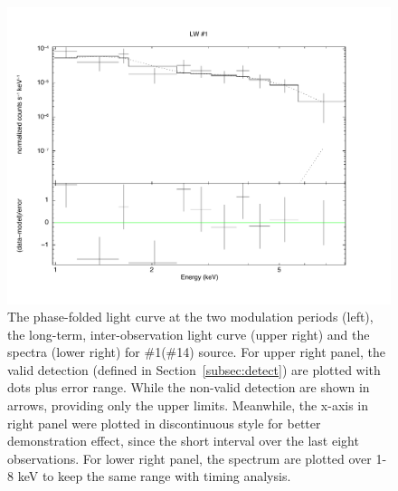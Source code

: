 \documentclass[fleqn,usenatbib]{mnras}
\begin{document}
\begin{figure}
\begin{minipage}[b]{0.44\textwidth}
\includegraphics[width=1.01\textwidth]{./figure/LW/324001_spec.pdf}
\end{minipage}
\caption{The phase-folded light curve at the two modulation periods (left), the long-term, inter-observation light curve (upper right) and the spectra (lower right) for \#1(\#14) source.
For upper right panel, the valid detection (defined in Section~\ref{subsec:detect}) are plotted with dots plus error range. While the non-valid detection are shown in arrows, providing only the upper limits. Meanwhile, the x-axis in right panel were plotted in discontinuous style for better demonstration effect, since the short interval over the last eight observations.
For lower right panel, the spectrum are plotted over 1-8 keV to keep the same range with timing analysis.
}
\label{fig:pCV_sample_1}
\end{figure}
\end{document}

